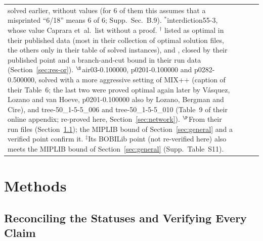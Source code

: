 \documentclass[]{spie}  %
\theoremstyle{plain}
\newcommand{\supp}[1]{Supp.\ Sec.~#1}
\newcommand{\inst}[1]{\mbox{#1}}             %
\begin{document}
\begin{table}[b]
\begin{tabular}{@{}l l l r@{}}
{solved earlier, without values (for 6 of them this assumes that a misprinted ``6/18'' means 6 of 6;
\supp{B.9}).\cite{dellacroce2020exact} $^{*}$\inst{interdiction55-3}, whose value Caprara
et~al.\ list without a proof. $^{\dagger}$\NumLitOrClaimed{} listed as optimal in
their published data (most in their collection of optimal solution files, the others only in
their table of solved instances), and \inst{\OrClosureName}, closed by their published point and a
branch-and-cut bound in their run data (Section~\ref{sec:res-or}). $^{\S}$\inst{air03-0.100000},
\inst{p0201-0.100000} and \inst{p0282-0.500000}, solved with a more aggressive setting of MIX++
(caption of their Table~6; the last two were proved optimal again later by V\'asquez, Lozano and
van Hoeve,\cite{vasquez2025single} \inst{p0201-0.100000} also by Lozano, Bergman and Cire), and
\inst{tree-50\_1-5-5\_006} and \inst{tree-50\_1-5-5\_010} (Table~9 of their online appendix;
re-proved here, Section~\ref{sec:network}). $^{\P}$From their run files (Section~\ref{sec:verify});
the MIPLIB bound of Section~\ref{sec:general} and a verified point confirm it.
$^{\ddagger}$Its BOBILib point (not re-verified here) also meets the MIPLIB bound of
Section~\ref{sec:general} (Supp.\ Table~S11).}
\end{tabular}
\end{table}

\section{Methods}\label{sec:methods}

\subsection{Reconciling the Statuses and Verifying Every Claim}\label{sec:verify}
\end{document}
